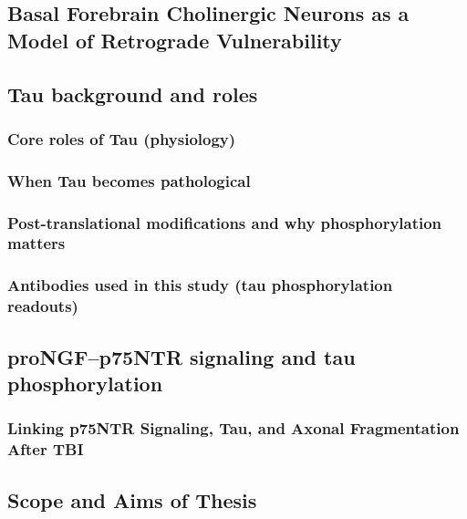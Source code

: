 \documentclass[
]{article}
\begin{document}
\subsection{Basal Forebrain Cholinergic Neurons as a Model of Retrograde Vulnerability}\label{basal-forebrain-cholinergic-neurons-as-a-model-of-retrograde-vulnerability}

\subsection{Tau background and roles}\label{tau-background-and-roles}

\subsubsection{Core roles of Tau (physiology)}\label{core-roles-of-tau-physiology}

\subsubsection{When Tau becomes pathological}\label{when-tau-becomes-pathological}

\subsubsection{Post-translational modifications and why phosphorylation matters}\label{post-translational-modifications-and-why-phosphorylation-matters}

\subsubsection{Antibodies used in this study (tau phosphorylation readouts)}\label{antibodies-used-in-this-study-tau-phosphorylation-readouts}

\subsection{proNGF--p75NTR signaling and tau phosphorylation}\label{prongfp75ntr-signaling-and-tau-phosphorylation}

\subsubsection{Linking p75NTR Signaling, Tau, and Axonal Fragmentation After TBI}\label{linking-p75ntr-signaling-tau-and-axonal-fragmentation-after-tbi}

\subsection{Scope and Aims of Thesis}\label{scope-and-aims-of-thesis}
\end{document}
